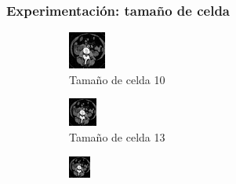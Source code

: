 \documentclass{beamer}
\begin{document}
\begin{frame}
\frametitle{Experimentación: tamaño de celda}

\begin{figure}
\centering

\begin{subfigure}{0.4\linewidth}
  \centering
  \includegraphics[width=0.6\linewidth]{celdas/tomo3-10-0}
  \caption{Tamaño de celda 10}
  \label{fig:muestras_celdas_tomo3_10}
\end{subfigure}%
\begin{subfigure}{0.4\linewidth}
  \centering
  \includegraphics[width=0.6\linewidth]{celdas/tomo3-13-0}
  \caption{Tamaño de celda 13}
\end{subfigure}
\begin{subfigure}{0.4\linewidth}
  \centering
  \includegraphics[width=0.6\linewidth]{celdas/tomo3-17-0}

\end{subfigure}
\end{figure}
\end{frame}
\end{document}
